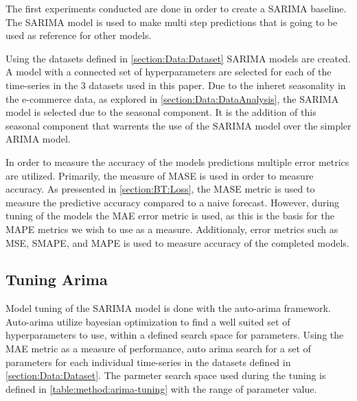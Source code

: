 \iffalse



The first experiments conducted are done in order to create a SARIMA baseline.
The SARIMA model is used to make multi step predictions that is going to be used as reference for other models.

Using the datasets defined in \cref{section:Data:Dataset} SARIMA models are created.
A model with a connected set of hyperparameters are selected for each of the time-series in the 3 datasets used in this paper.
Due to the inheret seasonality in the e-commerce data, as explored in \cref{section:Data:DataAnalysis},
the SARIMA model is selected due to the seasonal component.
It is the addition of this seasonal component that warrents the use of the SARIMA model over the simpler ARIMA model.

In order to measure the accuracy of the models predictions multiple error metrics are utilized.
Primarily, the measure of MASE is used in order to measure accuracy.
As pressented in \cref{section:BT:Loss}, the MASE metric is used to measure the predictive accuracy
compared to a naive forecast.
However, during tuning of the models the MAE error metric is used, as this is the basis for the MAPE metrics we wish to use as a measure.
Additionaly, error metrics such as MSE, SMAPE, and MAPE is used to measure accuracy of the completed models.

\subsection{Tuning Arima}
Model tuning of the SARIMA model is done with the auto-arima framework.
Auto-arima utilize bayesian optimization to find a well suited set of hyperparameters to use,
within a defined search space for parameters.
Using the MAE metric as a measure of performance, auto arima search for a set of parameters for each individual time-series
in the datasets defined in \cref{section:Data:Dataset}.
The parmeter search space used during the tuning is defined in \cref{table:method:arima-tuning} with the range of parameter value.

